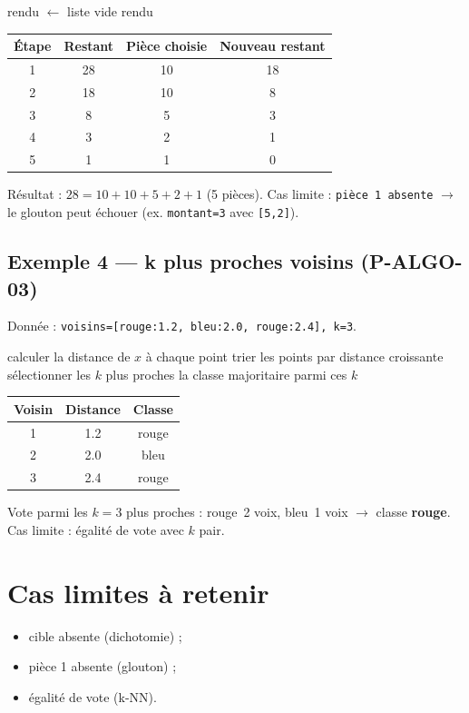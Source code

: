 \documentclass[a4paper,11pt]{article}
\begin{document}
\begin{algorithm}[H]
\SetAlgoLined
\DontPrintSemicolon
{}
rendu $\leftarrow$ liste vide\;
\Return rendu\;
\caption{Rendu de monnaie glouton}
\end{algorithm}

\medskip
\begin{center}
\begin{tabular}{cccc}
\toprule
Étape & Restant & Pièce choisie & Nouveau restant \\
\midrule
1 & 28 & 10 & 18 \\
2 & 18 & 10 & 8 \\
3 & 8 & 5 & 3 \\
4 & 3 & 2 & 1 \\
5 & 1 & 1 & 0 \\
\bottomrule
\end{tabular}
\end{center}
Résultat : $28 = 10 + 10 + 5 + 2 + 1$ (5 pièces). Cas limite : \texttt{pièce 1 absente} $\rightarrow$ le glouton peut échouer (ex. \texttt{montant=3} avec \texttt{[5,2]}).

\subsection*{Exemple 4 — k plus proches voisins (P-ALGO-03)}
Donnée : \texttt{voisins=[rouge:1.2, bleu:2.0, rouge:2.4], k=3}.

\begin{algorithm}[H]
\SetAlgoLined
\DontPrintSemicolon
{}
calculer la distance de $x$ à chaque point\;
trier les points par distance croissante\;
sélectionner les $k$ plus proches\;
\Return la classe majoritaire parmi ces $k$\;
\caption{Vote des $k$ plus proches voisins}
\end{algorithm}

\medskip
\begin{center}
\begin{tabular}{ccc}
\toprule
Voisin & Distance & Classe \\
\midrule
1 & 1.2 & rouge \\
2 & 2.0 & bleu \\
3 & 2.4 & rouge \\
\bottomrule
\end{tabular}
\end{center}
Vote parmi les $k=3$ plus proches : rouge~2 voix, bleu~1 voix $\rightarrow$ classe \textbf{rouge}. Cas limite : égalité de vote avec $k$ pair.

\section*{Cas limites à retenir}
\begin{itemize}[nosep]
  \item cible absente (dichotomie) ; \item pièce 1 absente (glouton) ; \item égalité de vote (k-NN).
\end{itemize}
\end{document}
